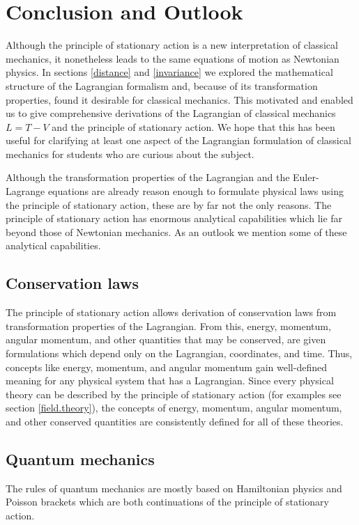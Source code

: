 \documentclass[prb,preprint]{revtex4-1}
\begin{document}
\section{Conclusion and Outlook}

Although the principle of stationary action is a new interpretation of classical mechanics, it nonetheless leads to the same equations of motion as Newtonian physics. In sections \ref{distance} and \ref{invariance} we explored the mathematical structure of the Lagrangian formalism and, because of its transformation properties, found it desirable for classical mechanics. This motivated and enabled us to give comprehensive derivations of the Lagrangian of classical mechanics $L=T-V$ and the principle of stationary action. We hope that this has been useful for clarifying at least one aspect of the Lagrangian formulation of classical mechanics for students who are curious about the subject.


Although the transformation properties of the Lagrangian and the Euler-Lagrange equations are already reason enough to formulate physical laws using the principle of stationary action, these are by far not the only reasons. The principle of stationary action has enormous analytical capabilities which lie far beyond those of Newtonian mechanics. As an outlook we mention some of these analytical capabilities.

\subsection{Conservation laws \cite{KleinertConservation}}
The principle of stationary action allows derivation of conservation laws from transformation properties of the Lagrangian. From this, energy, momentum, angular momentum, and other quantities that may be conserved, are given formulations which depend only on the Lagrangian, coordinates, and time. Thus, concepts like energy, momentum, and angular momentum gain well-defined meaning for any physical system that has a Lagrangian. Since every physical theory can be described by the principle of stationary action (for examples see section \ref{field.theory}), the concepts of energy, momentum, angular momentum, and other conserved quantities are consistently defined for all of these theories.

\subsection{Quantum mechanics \cite{Schwabl}}
The rules of quantum mechanics are mostly based on Hamiltonian physics and Poisson brackets which are both continuations of the principle of stationary action.
\end{document}
